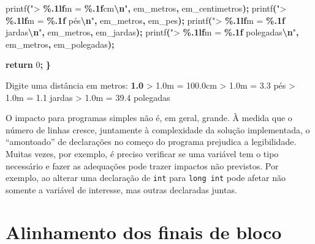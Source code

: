 \documentclass[
  11pt,
  a4paper,
]{scrbook}
\newenvironment{Shaded}{\begin{snugshade}}{\end{snugshade}}
\newcommand{\ControlFlowTok}[1]{\textcolor[rgb]{0.13,0.29,0.53}{\textbf{#1}}}
\newcommand{\DecValTok}[1]{\textcolor[rgb]{0.00,0.00,0.81}{#1}}
\newcommand{\KeywordTok}[1]{\textcolor[rgb]{0.13,0.29,0.53}{\textbf{#1}}}
\newcommand{\NormalTok}[1]{#1}
\newcommand{\OperatorTok}[1]{\textcolor[rgb]{0.81,0.36,0.00}{\textbf{#1}}}
\newcommand{\SpecialCharTok}[1]{\textcolor[rgb]{0.81,0.36,0.00}{\textbf{#1}}}
\newcommand{\StringTok}[1]{\textcolor[rgb]{0.31,0.60,0.02}{#1}}
\begin{document}
\begin{Shaded}
\begin{Highlighting}[]
 
\NormalTok{    printf}\OperatorTok{(}\StringTok{"\textgreater{} }\SpecialCharTok{\%.1lf}\StringTok{m = }\SpecialCharTok{\%.1f}\StringTok{cm}\SpecialCharTok{\textbackslash{}n}\StringTok{"}\OperatorTok{,}\NormalTok{ em\_metros}\OperatorTok{,}\NormalTok{ em\_centimetros}\OperatorTok{);}
\NormalTok{    printf}\OperatorTok{(}\StringTok{"\textgreater{} }\SpecialCharTok{\%.1lf}\StringTok{m = }\SpecialCharTok{\%.1f}\StringTok{ pés}\SpecialCharTok{\textbackslash{}n}\StringTok{"}\OperatorTok{,}\NormalTok{ em\_metros}\OperatorTok{,}\NormalTok{ em\_pes}\OperatorTok{);}
\NormalTok{    printf}\OperatorTok{(}\StringTok{"\textgreater{} }\SpecialCharTok{\%.1lf}\StringTok{m = }\SpecialCharTok{\%.1f}\StringTok{ jardas}\SpecialCharTok{\textbackslash{}n}\StringTok{"}\OperatorTok{,}\NormalTok{ em\_metros}\OperatorTok{,}\NormalTok{ em\_jardas}\OperatorTok{);}
\NormalTok{    printf}\OperatorTok{(}\StringTok{"\textgreater{} }\SpecialCharTok{\%.1lf}\StringTok{m = }\SpecialCharTok{\%.1f}\StringTok{ polegadas}\SpecialCharTok{\textbackslash{}n}\StringTok{"}\OperatorTok{,}\NormalTok{ em\_metros}\OperatorTok{,}\NormalTok{ em\_polegadas}\OperatorTok{);}

    \ControlFlowTok{return} \DecValTok{0}\OperatorTok{;}
\OperatorTok{\}}
\end{Highlighting}
\end{Shaded}

\begin{Shaded}
\begin{Highlighting}[]
\NormalTok{Digite uma distância em metros: }\KeywordTok{ 1.0 }
\NormalTok{\textgreater{} 1.0m = 100.0cm}
\NormalTok{\textgreater{} 1.0m = 3.3 pés}
\NormalTok{\textgreater{} 1.0m = 1.1 jardas}
\NormalTok{\textgreater{} 1.0m = 39.4 polegadas}
\end{Highlighting}
\end{Shaded}

O impacto para programas simples não é, em geral, grande. À medida que o
número de linhas cresce, juntamente à complexidade da solução
implementada, o ``amontoado'' de declarações no começo do programa
prejudica a legibilidade. Muitas vezes, por exemplo, é preciso verificar
se uma variável tem o tipo necessário e fazer as adequações pode trazer
impactos não previstos. Por exemplo, ao alterar uma declaração de
\texttt{int} para \texttt{long\ int} pode afetar não somente a variável
de interesse, mas outras declaradas juntas.

\section{Alinhamento dos finais de
bloco}\label{alinhamento-dos-finais-de-bloco}
\end{document}
